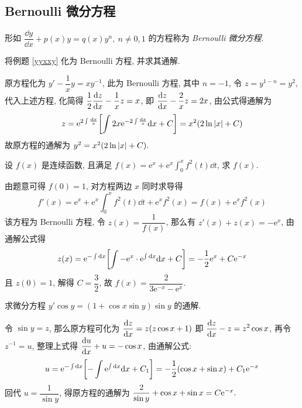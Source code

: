 \subsection{Bernoulli 微分方程}

\begin{definition}
    形如 $\dfrac{\dd y}{\dd x}+p(x)y=q(x)y^n,~n\not=0,1$ 的方程称为 \textit{Bernoulli 微分方程}.
\end{definition}

\begin{example}
    将例题 \ref{yyxxy} 化为 Bernoulli 方程, 并求其通解.
\end{example}
\begin{solution}
    原方程化为 $y'-\dfrac{1}{x}y=xy^{-1}$, 此为 Bernoulli 方程, 其中 $n=-1$, 令 $z=y^{1-n}=y^2$, 代入上述方程, 化简得
    $\dfrac{1}{2}\displaystyle\dv{z}{x}-\dfrac{1}{x}z=x$, 即 $\displaystyle\dv{z}{x}-\dfrac{2}{x}z=2x$, 由公式得通解为
    $$z=\mathrm{e}^{2\int\frac{\dd x}{x}}\qty[\int 2x\mathrm{e}^{-2\int\frac{\dd x}{x}}\dd x+C]=x^2\qty(2\ln|x|+C)$$
    故原方程的通解为 $y^2=x^2\qty(2\ln|x|+C).$
\end{solution}

\begin{example}[2023 合肥工业大学]
    设 $f(x)$ 是连续函数, 且满足 $f(x)=\mathrm{e}^x+\mathrm{e}^x\displaystyle\int_{0}^{x}f^2(t)\dd t$, 求 $f(x)$.
\end{example}
\begin{solution}
    由题意可得 $f(0)=1$, 对方程两边 $x$ 同时求导得
    $$f'(x)=\mathrm{e}^x+\mathrm{e}^x\int_{0}^{x}f^2(t)\dd t+\mathrm{e}^xf^2(x)=f(x)+\mathrm{e}^xf^2(x)$$
    该方程为 Bernoulli 方程, 令 $z(x)=\dfrac{1}{f(x)}$, 那么有 $z'(x)+z(x)=-\mathrm{e}^x$, 由通解公式得
    $$z(x)=\mathrm{e}^{-\int\dd x}\qty[\int-\mathrm{e}^x\cdot\mathrm{e}^{\int\dd x}\dd x+C]=-\dfrac{1}{2}\mathrm{e}^x+C\mathrm{e}^{-x}$$
    且 $z(0)=1$, 解得 $C=\dfrac{3}{2}$, 故 $f(x)=\dfrac{2}{3\mathrm{e}^{-x}-\mathrm{e}^x}.$
\end{solution}

\begin{example}
    求微分方程 $y'\cos y=(1+\cos x\sin y)\sin y$ 的通解.
\end{example}
\begin{solution}
    令 $\sin y=z$, 那么原方程可化为 $\displaystyle \dv{z}{x}=z(z\cos x+1)$ 即 $\displaystyle\dv{z}{x}-z=z^2\cos x$, 再令 $z^{-1}=u$, 整理上式得 $\displaystyle\dv{u}{x}+u=-\cos x$, 由通解公式:
    $$u=\mathrm{e}^{-\int\dd x}\qty[-\int\mathrm{e}^{\int\dd x}\dd x+C_1]=-\dfrac{1}{2}(\cos x+\sin x)+C_1\mathrm{e}^{-x}$$
    回代 $u=\dfrac{1}{\sin y}$, 得原方程的通解为 $\dfrac{2}{\sin y}+\cos x+\sin x=C\mathrm{e}^{-x}.$
\end{solution}


